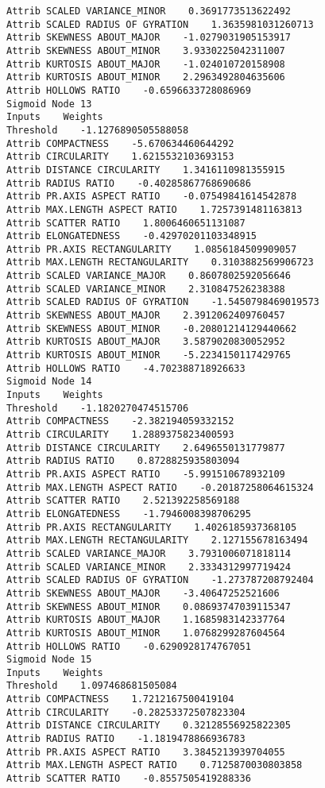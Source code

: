 \documentclass[
	article,			%
	11pt,				%
	oneside,			%
	a4paper,			%
	english,			%
	brazil,				%
	sumario=tradicional
	]{abntex2}
\begin{document}
\begin{lstlisting}
Attrib SCALED VARIANCE_MINOR    0.3691773513622492
Attrib SCALED RADIUS OF GYRATION    1.3635981031260713
Attrib SKEWNESS ABOUT_MAJOR    -1.0279031905153917
Attrib SKEWNESS ABOUT_MINOR    3.9330225042311007
Attrib KURTOSIS ABOUT_MAJOR    -1.024010720158908
Attrib KURTOSIS ABOUT_MINOR    2.2963492804635606
Attrib HOLLOWS RATIO    -0.6596633728086969
Sigmoid Node 13
Inputs    Weights
Threshold    -1.1276890505588058
Attrib COMPACTNESS    -5.670634460644292
Attrib CIRCULARITY    1.6215532103693153
Attrib DISTANCE CIRCULARITY    1.3416110981355915
Attrib RADIUS RATIO    -0.40285867768690686
Attrib PR.AXIS ASPECT RATIO    -0.07549841614542878
Attrib MAX.LENGTH ASPECT RATIO    1.7257391481163813
Attrib SCATTER RATIO    1.8006460651131087
Attrib ELONGATEDNESS    -0.42970201103348915
Attrib PR.AXIS RECTANGULARITY    1.0856184509909057
Attrib MAX.LENGTH RECTANGULARITY    0.3103882569906723
Attrib SCALED VARIANCE_MAJOR    0.8607802592056646
Attrib SCALED VARIANCE_MINOR    2.310847526238388
Attrib SCALED RADIUS OF GYRATION    -1.5450798469019573
Attrib SKEWNESS ABOUT_MAJOR    2.3912062409760457
Attrib SKEWNESS ABOUT_MINOR    -0.20801214129440662
Attrib KURTOSIS ABOUT_MAJOR    3.5879020830052952
Attrib KURTOSIS ABOUT_MINOR    -5.2234150117429765
Attrib HOLLOWS RATIO    -4.702388718926633
Sigmoid Node 14
Inputs    Weights
Threshold    -1.1820270474515706
Attrib COMPACTNESS    -2.382194059332152
Attrib CIRCULARITY    1.2889375823400593
Attrib DISTANCE CIRCULARITY    2.6496550131779877
Attrib RADIUS RATIO    0.8728825935803094
Attrib PR.AXIS ASPECT RATIO    -5.991510678932109
Attrib MAX.LENGTH ASPECT RATIO    -0.20187258064615324
Attrib SCATTER RATIO    2.521392258569188
Attrib ELONGATEDNESS    -1.7946008398706295
Attrib PR.AXIS RECTANGULARITY    1.4026185937368105
Attrib MAX.LENGTH RECTANGULARITY    2.127155678163494
Attrib SCALED VARIANCE_MAJOR    3.7931006071818114
Attrib SCALED VARIANCE_MINOR    2.3334312997719424
Attrib SCALED RADIUS OF GYRATION    -1.273787208792404
Attrib SKEWNESS ABOUT_MAJOR    -3.40647252521606
Attrib SKEWNESS ABOUT_MINOR    0.08693747039115347
Attrib KURTOSIS ABOUT_MAJOR    1.1685983142337764
Attrib KURTOSIS ABOUT_MINOR    1.0768299287604564
Attrib HOLLOWS RATIO    -0.6290928174767051
Sigmoid Node 15
Inputs    Weights
Threshold    1.097468681505084
Attrib COMPACTNESS    1.7212167500419104
Attrib CIRCULARITY    -0.28253372507823304
Attrib DISTANCE CIRCULARITY    0.32128556925822305
Attrib RADIUS RATIO    -1.1819478866936783
Attrib PR.AXIS ASPECT RATIO    3.3845213939704055
Attrib MAX.LENGTH ASPECT RATIO    0.7125870030803858
Attrib SCATTER RATIO    -0.8557505419288336

\end{lstlisting}
\end{document}
